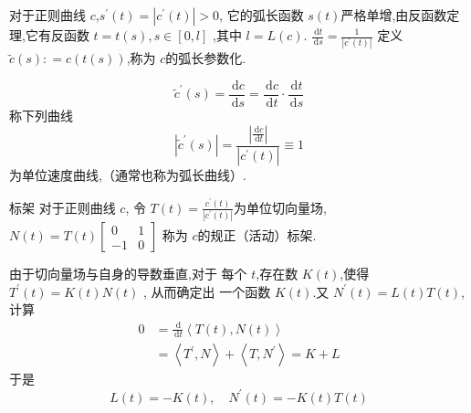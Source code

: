 \documentclass[../../古典微分几何.tex]{subfiles}
\begin{document}
\begin{definition}
    对于正则曲线 \(  c  \),\(  s^{\prime} \left( t \right)= \left| c^{\prime} \left( t \right)  \right| >0   \), 它的弧长函数 \(  s\left( t \right)   \)严格单增,由反函数定理,它有反函数 \(  t =  t\left( s \right),s \in [0,l]   \) ,其中 \(  l = L\left( c \right)   \). \(  \frac{\,\mathrm{d} t }{ \,\mathrm{d} s} =  \frac{1 }{\left| c^{\prime} \left( t \right)  \right|  }    \)  
    定义 \(  \tilde{c}\left( s \right): =  c\left( t\left( s \right)  \right)    \),称为 \(  c  \)的弧长参数化.  
\end{definition}
\begin{remark}
    \[
        \tilde{c}^{\prime} \left( s \right)=  \frac{\,\mathrm{d} c }{\,\mathrm{d} s } =  \frac{\,\mathrm{d} c }{\,\mathrm{d} t }\cdot \frac{\,\mathrm{d} t }{\,\mathrm{d} s }    
        \]称下列曲线\[
        \left| \tilde{c}^{\prime} \left( s \right)  \right| =  \frac{\left| \frac{\,\mathrm{d} c }{\,\mathrm{d} t }  \right|  }{\left| c ^{\prime} \left( t \right) \right|  }  \equiv 1
        \]为单位速度曲线,（通常也称为弧长曲线）. 

   
\end{remark}


\begin{definition}{标架}
    对于正则曲线 \(  c  \), 
    令 \(  T\left( t \right)=  \frac{c^{\prime} \left( t \right)  }{\left| c^{\prime} \left( t \right)  \right|  }    \)为单位切向量场, \(  N\left( t \right)=  T\left( t \right) \begin{bmatrix} 
        0&1\\ 
         -1&0 
    \end{bmatrix}     \)  称为 \(  c  \)的规正（活动）标架.
\end{definition}

由于切向量场与自身的导数垂直,对于 每个 \(  t  \),存在数 \(  K\left( t \right)   \),使得 \(  T^{\prime} \left( t \right)=  K\left( t \right) N\left( t \right)     \) ,
从而确定出 一个函数 \(  K\left( t \right)   \).又 \(  N^{\prime} \left( t \right)= L\left( t \right)T\left( t \right)     \),计算 \[
\begin{aligned}
0& = \frac{\,\mathrm{d}  }{\,\mathrm{d} t }\left<T\left( t \right),N\left( t \right)   \right>\\ 
 & =  \left<T^{\prime} ,N \right>+ \left<T,N^{\prime}  \right>  = K+ L
\end{aligned}
\]    于是 \[
L\left( t \right)= - K\left( t \right),\quad  N^{\prime} \left( t \right)= -K\left( t \right)T\left( t \right)    
\]
\end{document}
